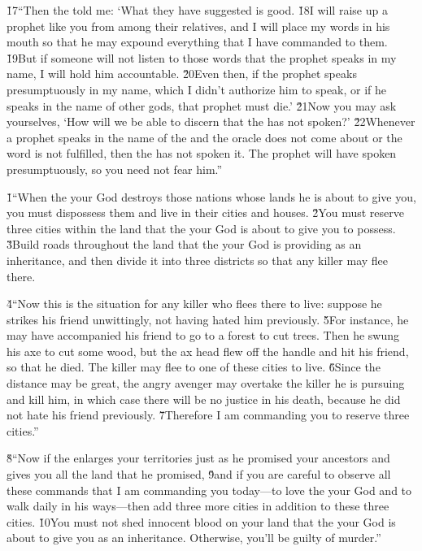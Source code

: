 \v{17}``Then the  told me: `What they have suggested is good. \v{18}I will raise up a prophet like you from among their relatives, and I will place my words in his mouth so that he may expound everything that I have commanded to them. \v{19}But if someone will not listen to those words that the prophet speaks in my name, I will hold him accountable. \v{20}Even then, if the prophet speaks presumptuously in my name, which I didn't authorize him to speak, or if he speaks in the name of other gods, that prophet must die.' \v{21}Now you may ask yourselves, `How will we be able to discern that the  has not spoken?' \v{22}Whenever a prophet speaks in the name of the  and the oracle does not come about or the word is not fulfilled, then the  has not spoken it. The prophet will have spoken presumptuously, so you need not fear him.''

\v{1}``When the  your God destroys those nations whose lands he is about to give you, you must dispossess them and live in their cities and houses. \v{2}You must reserve three cities within the land that the  your God is about to give you to possess. \v{3}Build roads throughout the land that the  your God is providing as an inheritance, and then divide it into three districts so that any killer may flee there.

\v{4}``Now this is the situation for any killer who flees there to live: suppose he strikes his friend unwittingly, not having hated him previously. \v{5}For instance, he may have accompanied his friend to go to a forest to cut trees. Then he swung his axe to cut some wood, but the ax head flew off the handle and hit his friend, so that he died. The killer may flee to one of these cities to live. \v{6}Since the distance may be great, the angry avenger may overtake the killer he is pursuing and kill him, in which case there will be no justice in his death, because he did not hate his friend previously. \v{7}Therefore I am commanding you to reserve three cities.''

\v{8}``Now if the  enlarges your territories just as he promised your ancestors and gives you all the land that he promised, \v{9}and if you are careful to observe all these commands that I am commanding you today---to love the  your God and to walk daily in his ways---then add three more cities in addition to these three cities. \v{10}You must not shed innocent blood on your land that the  your God is about to give you as an inheritance. Otherwise, you'll be guilty of murder.''

